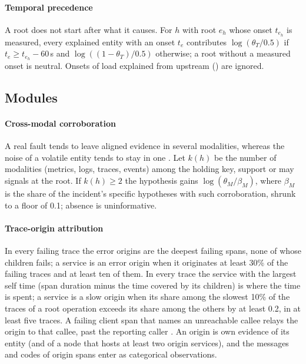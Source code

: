 \paragraph{Temporal precedence}
A root does not start after what it causes. For $h$ with root $e_h$ whose onset $t_{e_h}$ is measured, every explained entity with an
onset $t_e$ contributes $\log(\theta_T/0.5)$ if $t_e\geq t_{e_h}-60$\,s and $\log((1-\theta_T)/0.5)$ otherwise; a root without a
measured onset is neutral. Onsets of load explained from upstream () are ignored.

\subsection{Modules}\label{sec:modules}

\paragraph{ Cross-modal corroboration}
A real fault tends to leave aligned evidence in several modalities, whereas the noise of a volatile entity tends to stay in one
\citep{zhang2023diagfusion,cai2026benchmark}. Let $k(h)$ be the number of modalities (metrics, logs, traces, events) among the
holding key, support or may signals at the root. If $k(h)\geq2$ the hypothesis gains $\log(\theta_M/\beta_M)$, where $\beta_M$ is the
share of the incident's specific hypotheses with such corroboration, shrunk to a floor of 0.1; absence is uninformative.

\paragraph{ Trace-origin attribution}
In every failing trace the error origins are the deepest failing spans, none of whose children fails; a service is an error origin
when it originates at least 30\% of the failing traces and at least ten of them. In every trace the service with the largest self
time (span duration minus the time covered by its children) is where the time is spent; a service is a slow origin when its share
among the slowest 10\% of the traces of a root operation exceeds its share among the others by at least 0.2, in at least five
traces. A failing client span that names an unreachable callee relays the origin to that callee, past
the reporting caller \citep{li2021tracerca}. An origin is own evidence of its entity (and of a node that hosts at least two origin
services), and the messages and codes of origin spans enter as categorical observations.

